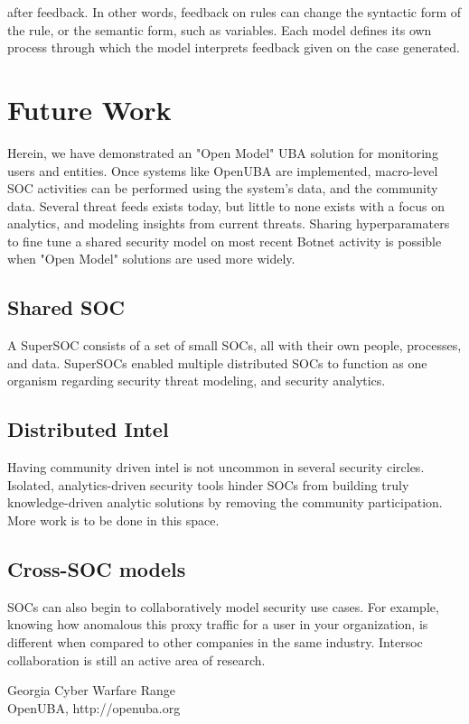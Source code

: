 \documentclass[10pt, titlepage, twocolumn]{article}
\begin{document}
after feedback. In other words, feedback on rules can change the syntactic form of the rule, or the semantic form, such as variables. Each model defines its own process through which the model interprets feedback given on the case generated. 



\section{Future Work}

Herein, we have demonstrated an "Open Model" UBA solution for monitoring users and entities. Once systems like OpenUBA are implemented, macro-level SOC activities can be performed using the system's data, and the community data. Several threat feeds exists today, but little to none exists with a focus on analytics, and modeling insights from current threats. Sharing hyperparamaters to fine tune a shared security model on most recent Botnet activity is possible when "Open Model" solutions are used more widely. 

\subsection{Shared SOC}
A SuperSOC consists of a set of small SOCs, all with their own people, processes, and data. SuperSOCs enabled multiple distributed SOCs to function as one organism regarding security threat modeling, and security analytics.


\subsection{Distributed Intel}
Having community driven intel is not uncommon in several security circles. Isolated, analytics-driven security tools hinder SOCs from building truly knowledge-driven analytic solutions by removing the community participation. More work is to be done in this space. 

\subsection{Cross-SOC models}
SOCs can also begin to collaboratively model security use cases. For example, knowing how anomalous this proxy traffic for a user in your organization, is different when compared to other companies in the same industry. Intersoc collaboration is still an active area of research.


\begin{thebibliography}{9}

Georgia Cyber Warfare Range \\
OpenUBA, http://openuba.org

\end{thebibliography}
\end{document}
